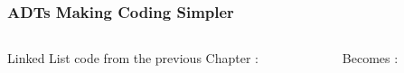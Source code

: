 
\begin{frame}[fragile]
\frametitle{ADTs Making Coding Simpler}
\begin{columns}[T]

\begin{column}{0.45\textwidth}
{\small Linked List code from the previous Chapter :}

\end{column}

\pause
\begin{column}{0.45\textwidth}
{\small Becomes :}

\end{column}

\end{columns}
\end{frame}


\endinput
